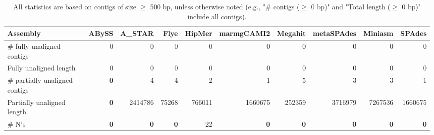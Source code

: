 \documentclass[12pt,a4paper]{article}
\begin{document}
\begin{table}[ht]
\begin{center}
\caption{All statistics are based on contigs of size $\geq$ 500 bp, unless otherwise noted (e.g., "\# contigs ($\geq$ 0 bp)" and "Total length ($\geq$ 0 bp)" include all contigs).}
\begin{tabular}{|l*{9}{|r}|}
\hline
Assembly & ABySS & A\_STAR & Flye & HipMer & marmgCAMI2 & Megahit & metaSPAdes & Miniasm & SPAdes \\ \hline
\# fully unaligned contigs & 0 & 0 & 0 & 0 & 0 & 0 & 0 & 0 & 0 \\ \hline
Fully unaligned length & 0 & 0 & 0 & 0 & 0 & 0 & 0 & 0 & 0 \\ \hline
\# partially unaligned contigs & {\bf 0} & 4 & 4 & 2 & 1 & 5 & 3 & 3 & 1 \\ \hline
Partially unaligned length & {\bf 0} & 2414786 & 75268 & 766011 & 1660675 & 252359 & 3716979 & 7267536 & 1660675 \\ \hline
\# N's & {\bf 0} & {\bf 0} & {\bf 0} & 22 & {\bf 0} & {\bf 0} & {\bf 0} & {\bf 0} & {\bf 0} \\ \hline
\end{tabular}
\end{center}
\end{table}
\end{document}
